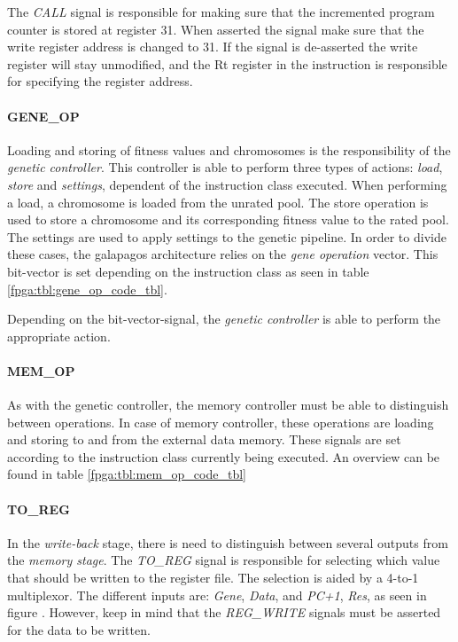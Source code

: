The \emph{CALL} signal is responsible for making sure that the incremented program counter is stored at register 31.
When asserted the signal make sure that the write register address is changed to 31.
If the signal is de-asserted the write register will stay unmodified, and the Rt register in the instruction is responsible for specifying the register address.


\paragraph{GENE\_OP}
Loading and storing of fitness values and chromosomes is the responsibility of the \emph{genetic controller}.
This controller is able to perform three types of actions: \emph{load}, \emph{store} and \emph{settings}, dependent of the instruction class executed.
When performing a load, a chromosome is loaded from the unrated pool.
The store operation is used to store a chromosome and its corresponding fitness value to the rated pool.
The settings are used to apply settings to the genetic pipeline.
In order to divide these cases, the galapagos architecture relies on the \emph{gene operation} vector.
This bit-vector is set depending on the instruction class as seen in table \ref{fpga:tbl:gene_op_code_tbl}.



Depending on the bit-vector-signal, the \emph{genetic controller} is able to perform the appropriate action. 

\paragraph{MEM\_OP}
As with the genetic controller, the memory controller must be able to distinguish between operations.
In case of memory controller, these operations are loading and storing to and from the external data memory.
These signals are set according to the instruction class currently being executed.
An overview can be found in table \ref{fpga:tbl:mem_op_code_tbl}



\paragraph{TO\_REG}
In the \emph{write-back} stage, there is need to distinguish between several outputs from the \emph{memory stage}.
The \emph{TO\_REG} signal is responsible for selecting which value that should be written to the register file.
The selection is aided by a 4-to-1 multiplexor.
The different inputs are: \emph{Gene}, \emph{Data}, and \emph{PC+1}, \emph{Res}, as seen in figure .
However, keep in mind that the \emph{REG\_WRITE} signals must be asserted for the data to be written. 


